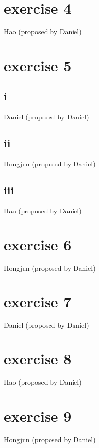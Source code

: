 \documentclass{article}
\begin{document}
\section*{exercise 4}

Hao (proposed by Daniel)
\section*{exercise 5}
\subsection*{i}
Daniel (proposed by Daniel)
\subsection*{ii}
Hongjun (proposed by Daniel)
\subsection*{iii}
Hao (proposed by Daniel)
\section*{exercise 6}
Hongjun (proposed by Daniel)
\section*{exercise 7}
Daniel (proposed by Daniel)
\section*{exercise 8}
Hao (proposed by Daniel)
\section*{exercise 9}
Hongjun (proposed by Daniel)
\end{document}
